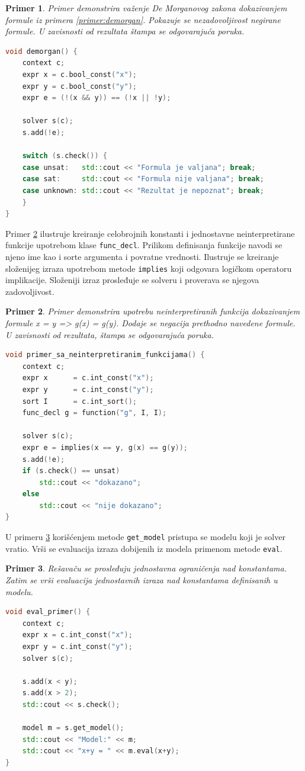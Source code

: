 \documentclass[12pt,oneside]{memoir}
\newtheorem{primer}{Primer}
\begin{document}
\begin{primer} \label{ex1} Primer demonstrira važenje De Morganovog zakona dokazivanjem formule iz primera \ref{primer:demorgan}. Pokazuje se nezadovoljivost negirane formule. U zavisnosti od rezultata štampa se odgovarajuća poruka.
\begin{lstlisting}[language=C++]
void demorgan() {
    context c;
    expr x = c.bool_const("x");
    expr y = c.bool_const("y");
    expr e = (!(x && y)) == (!x || !y);
    
    solver s(c);
    s.add(!e);

    switch (s.check()) {
    case unsat:   std::cout << "Formula je valjana"; break;
    case sat:     std::cout << "Formula nije valjana"; break;
    case unknown: std::cout << "Rezultat je nepoznat"; break;
    }
}
\end{lstlisting}
\end{primer}

Primer \ref{ex2} ilustruje kreiranje celobrojnih konstanti i jednostavne neinterpretirane funkcije upotrebom klase \texttt{func\_decl}. Prilikom definisanja funkcije navodi se njeno ime kao i sorte argumenta i povratne vrednosti. Ilustruje se kreiranje složenijeg izraza upotrebom metode \texttt{implies} koji odgovara logičkom operatoru implikacije. Složeniji izraz prosleđuje se solveru i proverava se njegova zadovoljivost.
\begin{primer} \label{ex2} Primer demonstrira upotrebu neinterpretiranih funkcija dokazivanjem formule x = y => g(x) = g(y). Dodaje se negacija prethodno navedene formule. U zavisnosti od rezultata, štampa se odgovarajuća poruka.\\
\begin{lstlisting}[language=C++]
void primer_sa_neinterpretiranim_funkcijama() { 
    context c;
    expr x      = c.int_const("x");
    expr y      = c.int_const("y");
    sort I      = c.int_sort();
    func_decl g = function("g", I, I);
    
    solver s(c);
    expr e = implies(x == y, g(x) == g(y));
    s.add(!e);
    if (s.check() == unsat) 
        std::cout << "dokazano";
    else
        std::cout << "nije dokazano";
}
\end{lstlisting}
\end{primer}
\par
U primeru \ref{ex3} korišćenjem metode \texttt{get\_model} pristupa se modelu koji je solver vratio. Vrši se evaluacija izraza dobijenih iz modela primenom metode \texttt{eval}.  
\begin{primer} \label{ex3} Rešavaču se prosleđuju jednostavna ograničenja nad konstantama. Zatim se vrši evaluacija jednostavnih izraza nad konstantama definisanih u modelu.
\begin{lstlisting}[language=C++]
void eval_primer() {
    context c;
    expr x = c.int_const("x");
    expr y = c.int_const("y");
    solver s(c);

    s.add(x < y);
    s.add(x > 2);
    std::cout << s.check();
    
    model m = s.get_model();
    std::cout << "Model:" << m;
    std::cout << "x+y = " << m.eval(x+y);
}
\end{lstlisting}
\end{primer}
\end{document}

